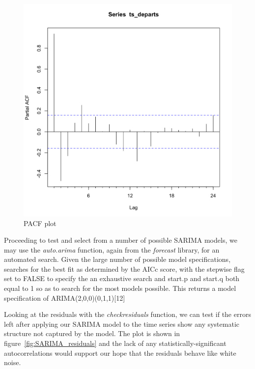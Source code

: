 \documentclass[9pt,technote]{IEEEtran}
\begin{document}
\begin{figure}[htbp]
\centerline{\includegraphics[scale=0.25]{Pacf.png}}
\caption{PACF plot}
\label{fig:Pacf}
\end{figure}

Proceeding to test and select from a number of possible SARIMA models, we may use the \textit{auto.arima} function, again from the \textit{forecast} library, for an automated search.  Given the large number of possible model specifications, searches for the best fit as determined by the AICc score, with the stepwise flag set to FALSE to specify the an exhaustive search and start.p and start.q both equal to 1 so as to search for the most models possible.  This returns a model specification of ARIMA(2,0,0)(0,1,1)[12]  

Looking at the residuals with the \textit{checkresiduals} function, we can test if the errors left after applying our SARIMA model to the time series show any systematic structure not captured by the model.  The plot is shown in figure~\ref{fig:SARIMA_residuals} and the lack of any statistically-significant autocorrelations would support our hope that the residuals behave like white noise. 
\end{document}
